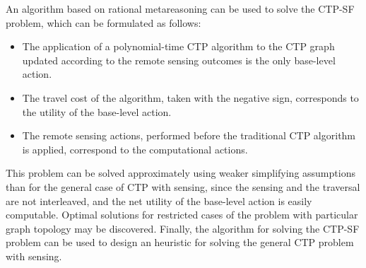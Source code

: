 An algorithm based on rational
metareasoning can be used to solve the CTP-SF problem, which can be
formulated as follows:
\begin{itemize}
\item The application of a polynomial-time CTP algorithm to the CTP
  graph updated according to the remote sensing outcomes is the only
  base-level action.
\item The travel cost of the algorithm, taken with the negative sign,
  corresponds to the utility of the base-level action.
\item The remote sensing actions, performed before the traditional CTP
  algorithm is applied, correspond to the computational actions.
\end{itemize}
This problem can be solved approximately using weaker simplifying
assumptions than for the general case of CTP with sensing, since the
sensing and the traversal are not interleaved, and the net utility of
the base-level action is easily computable. Optimal solutions for
restricted cases of the problem with particular graph topology may be
discovered. Finally, the algorithm for solving the CTP-SF problem
can be used to design an heuristic for solving the general CTP problem
with sensing.